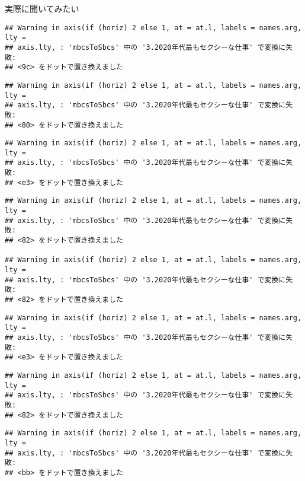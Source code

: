 \documentclass[ignorenonframetext,]{beamer}
\begin{document}
\begin{frame}[fragile]{実際に聞いてみたい}
\begin{verbatim}
## Warning in axis(if (horiz) 2 else 1, at = at.l, labels = names.arg, lty =
## axis.lty, : 'mbcsToSbcs' 中の '3.2020年代最もセクシーな仕事' で変換に失敗:
## <9c> をドットで置き換えました
\end{verbatim}

\begin{verbatim}
## Warning in axis(if (horiz) 2 else 1, at = at.l, labels = names.arg, lty =
## axis.lty, : 'mbcsToSbcs' 中の '3.2020年代最もセクシーな仕事' で変換に失敗:
## <80> をドットで置き換えました
\end{verbatim}

\begin{verbatim}
## Warning in axis(if (horiz) 2 else 1, at = at.l, labels = names.arg, lty =
## axis.lty, : 'mbcsToSbcs' 中の '3.2020年代最もセクシーな仕事' で変換に失敗:
## <e3> をドットで置き換えました
\end{verbatim}

\begin{verbatim}
## Warning in axis(if (horiz) 2 else 1, at = at.l, labels = names.arg, lty =
## axis.lty, : 'mbcsToSbcs' 中の '3.2020年代最もセクシーな仕事' で変換に失敗:
## <82> をドットで置き換えました

## Warning in axis(if (horiz) 2 else 1, at = at.l, labels = names.arg, lty =
## axis.lty, : 'mbcsToSbcs' 中の '3.2020年代最もセクシーな仕事' で変換に失敗:
## <82> をドットで置き換えました
\end{verbatim}

\begin{verbatim}
## Warning in axis(if (horiz) 2 else 1, at = at.l, labels = names.arg, lty =
## axis.lty, : 'mbcsToSbcs' 中の '3.2020年代最もセクシーな仕事' で変換に失敗:
## <e3> をドットで置き換えました
\end{verbatim}

\begin{verbatim}
## Warning in axis(if (horiz) 2 else 1, at = at.l, labels = names.arg, lty =
## axis.lty, : 'mbcsToSbcs' 中の '3.2020年代最もセクシーな仕事' で変換に失敗:
## <82> をドットで置き換えました
\end{verbatim}

\begin{verbatim}
## Warning in axis(if (horiz) 2 else 1, at = at.l, labels = names.arg, lty =
## axis.lty, : 'mbcsToSbcs' 中の '3.2020年代最もセクシーな仕事' で変換に失敗:
## <bb> をドットで置き換えました
\end{verbatim}


\end{frame}
\end{document}
